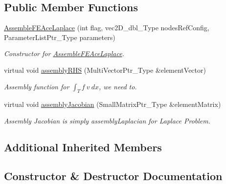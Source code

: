 \subsection*{Public Member Functions}
\begin{DoxyCompactItemize}
\item 
\hyperlink{classFEDD_1_1AssembleFEAceLaplace_a3e81060bb08ca1a1b9764e432eeed762}{Assemble\+F\+E\+Ace\+Laplace} (int flag, vec2\+D\+\_\+dbl\+\_\+\+Type nodes\+Ref\+Config, Parameter\+List\+Ptr\+\_\+\+Type parameters)
\begin{DoxyCompactList}\small\item\em Constructor for \hyperlink{classFEDD_1_1AssembleFEAceLaplace}{Assemble\+F\+E\+Ace\+Laplace}. \end{DoxyCompactList}\item 
virtual void \hyperlink{classFEDD_1_1AssembleFEAceLaplace_abbd14669795dbf1282dc70652c56c163}{assembly\+R\+HS} (Multi\+Vector\+Ptr\+\_\+\+Type \&element\+Vector)
\begin{DoxyCompactList}\small\item\em Assembly function for $ \int_T f ~ v ~dx $, we need to. \end{DoxyCompactList}\item 
virtual void \hyperlink{classFEDD_1_1AssembleFEAceLaplace_a1f6a762a706c60985cb151f9cc76850a}{assembly\+Jacobian} (Small\+Matrix\+Ptr\+\_\+\+Type \&element\+Matrix)
\begin{DoxyCompactList}\small\item\em Assembly Jacobian is simply assembly\+Laplacian for Laplace Problem. \end{DoxyCompactList}\end{DoxyCompactItemize}
\subsection*{Additional Inherited Members}


\subsection{Constructor \& Destructor Documentation}
\mbox{\label{classFEDD_1_1AssembleFEAceLaplace_a3e81060bb08ca1a1b9764e432eeed762}} 
